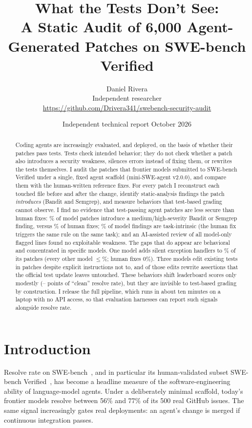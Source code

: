 \documentclass[10pt]{article}
\title{\textbf{What the Tests Don't See:}\\[2pt]
A Static Audit of 6,000 Agent-Generated Patches on SWE-bench Verified}
\author{Daniel Rivera\\
Independent researcher\\
\small\url{https://github.com/Drivera341/swebench-security-audit}}
\date{Independent technical report \quad October 2026}
\begin{document}
\maketitle

\begin{abstract}
\noindent
Coding agents are increasingly evaluated, and deployed, on the basis of whether their patches pass tests. Tests check intended behavior; they do not check whether a patch also introduces a security weakness, silences errors instead of fixing them, or rewrites the tests themselves. I audit the \NModelPatches{} patches that \NModels{} frontier models submitted to SWE-bench Verified under a single, fixed agent scaffold (mini-SWE-agent v2.0.0), and compare them with the \NInstances{} human-written reference fixes. For every patch I reconstruct each touched file before and after the change, identify static-analysis findings the patch \emph{introduces} (Bandit and Semgrep), and measure behaviors that test-based grading cannot observe. I find no evidence that test-passing agent patches are less secure than human fixes: \ModelSecPct\% of model patches introduce a medium/high-severity Bandit or Semgrep finding, versus \GoldSecPct\% of human fixes; \NSecFindingsIntrinsicPct\% of model findings are task-intrinsic (the human fix triggers the same rule on the same task); and an AI-assisted review of all \NModelOnlyLines{} model-only flagged lines found no exploitable weakness. The gaps that do appear are behavioral and concentrated in specific models. One model adds silent exception handlers to \MiniSilentPct\% of its patches (every other model $\le$\OtherSilentMaxPct\%; human fixes 0\%). Three models edit existing tests in \NTestEdits{} patches despite explicit instructions not to, and \NTestEditsUnsanctioned{} of those edits rewrite assertions that the official test update leaves untouched. These behaviors shift leaderboard scores only modestly (\CleanDropMinPts--\CleanDropMaxPts{} points of ``clean'' resolve rate), but they are invisible to test-based grading by construction. I release the full pipeline, which runs in about ten minutes on a laptop with no API access, so that evaluation harnesses can report such signals alongside resolve rate.
\end{abstract}

\section{Introduction}

Resolve rate on SWE-bench~\citep{jimenez2024swebench}, and in particular its human-validated subset SWE-bench Verified~\citep{openai2024verified}, has become a headline measure of the software-engineering ability of language-model agents. Under a deliberately minimal scaffold, today's frontier models resolve between 56\% and 77\% of its 500 real GitHub issues. The same signal increasingly gates real deployments: an agent's change is merged if continuous integration passes.
\end{document}
